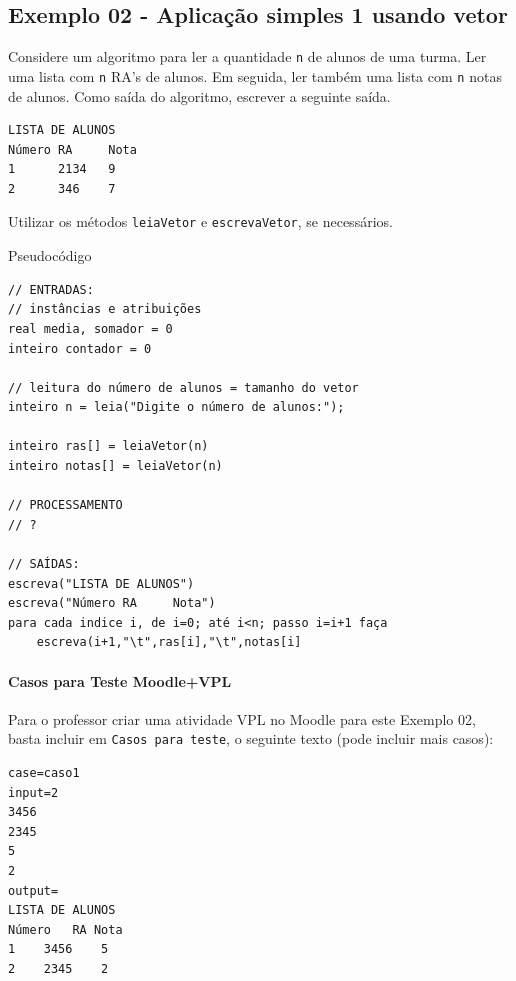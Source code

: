 \documentclass[12pt,a4paper]{article}
\begin{document}
    \hypertarget{exemplo-02---aplicauxe7uxe3o-simples-1-usando-vetor}{%
\subsection{Exemplo 02 - Aplicação simples 1 usando
vetor}\label{exemplo-02---aplicauxe7uxe3o-simples-1-usando-vetor}}

Considere um algoritmo para ler a quantidade \texttt{n} de alunos de uma
turma. Ler uma lista com \texttt{n} RA's de alunos. Em seguida, ler
também uma lista com \texttt{n} notas de alunos. Como saída do
algoritmo, escrever a seguinte saída.

\begin{verbatim}
LISTA DE ALUNOS
Número RA     Nota
1      2134   9
2      346    7
\end{verbatim}

Utilizar os métodos \texttt{leiaVetor} e \texttt{escrevaVetor}, se
necessários.

    Pseudocódigo

\begin{verbatim}
// ENTRADAS:
// instâncias e atribuições
real media, somador = 0
inteiro contador = 0

// leitura do número de alunos = tamanho do vetor
inteiro n = leia("Digite o número de alunos:");

inteiro ras[] = leiaVetor(n)
inteiro notas[] = leiaVetor(n)
 
// PROCESSAMENTO
// ?

// SAÍDAS:
escreva("LISTA DE ALUNOS")
escreva("Número RA     Nota")
para cada indice i, de i=0; até i<n; passo i=i+1 faça 
    escreva(i+1,"\t",ras[i],"\t",notas[i]
\end{verbatim}

    \hypertarget{casos-para-teste-moodlevpl}{%
\paragraph{Casos para Teste
Moodle+VPL}\label{casos-para-teste-moodlevpl}}

Para o professor criar uma atividade VPL no Moodle para este Exemplo 02,
basta incluir em \texttt{Casos\ para\ teste}, o seguinte texto (pode
incluir mais casos):

\begin{verbatim}
case=caso1
input=2
3456
2345
5
2
output= 
LISTA DE ALUNOS
Número   RA Nota
1    3456    5
2    2345    2
\end{verbatim}
\end{document}
